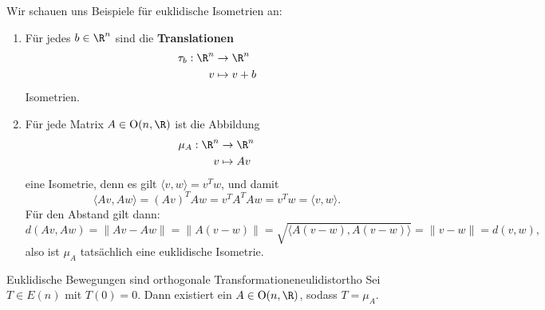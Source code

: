 \begin{beispiele} Wir schauen uns Beispiele für euklidische Isometrien an:
\begin{enumerate}
\item Für jedes $b \in \R^n$ sind die \textbf{Translationen}
\begin{equation}
\begin{split}
\tau_b: \R^n &\to \R^n \\
v &\mapsto v + b
\end{split}
\end{equation}
Isometrien.
\item Für jede Matrix $A \in \text{O}(n,\R)$ ist die Abbildung
\begin{equation}
\begin{split}
\mu_A: \R^n &\to \R^n\\
v &\mapsto Av
\end{split}
\end{equation}
eine Isometrie, denn es gilt $\langle v, w \rangle = v^Tw$, und damit
\begin{equation}
\langle Av, Aw \rangle = (Av)^T Aw = v^T A^T A w = v^T w = \langle v, w \rangle.
\end{equation}
Für den Abstand gilt dann:
\begin{equation}
d(Av,Aw) = \| Av-Aw\| = \|A(v-w)\| = \sqrt{\langle A(v-w), A(v-w) \rangle} = \|v-w\| = d(v,w),
\end{equation}
also ist $\mu_A$ tatsächlich eine euklidische Isometrie.
\end{enumerate}
\end{beispiele}
\begin{satz}{Euklidische Bewegungen sind orthogonale Transformationen}{eulidistortho}
Sei $T \in E(n)$ mit $T(0) = 0$. Dann existiert ein $A \in \text{O}(n, \R)$, sodass $T = \mu_A$.
\end{satz}
